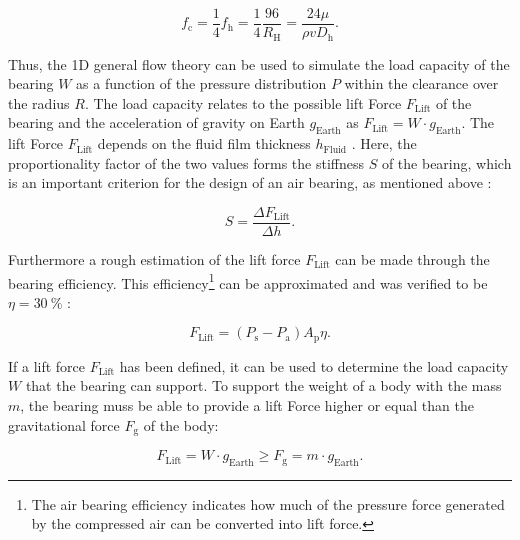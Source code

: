 \begin{equation}
f_\text{c}=\frac{1}{4} f_\text{h} = \frac{1}{4} \frac{96}{R_\text{H}} = \dfrac{24 \mu}{\rho v D_\text{h}} .
\label{eqn:hfric}
\end{equation}

Thus, the 1D general flow theory can be used to simulate the load capacity of the bearing $W$ as a function of the pressure distribution $P$ within the clearance over the radius $R$. The load capacity relates to the possible lift Force $F_\text{Lift}$ of the bearing and the acceleration of gravity on Earth $ g_\text{Earth}$ as $F_\text{Lift} = W \cdot g_\text{Earth}$. The lift Force $F_\text{Lift}$ depends on the fluid film thickness $h_\text{Fluid}$ . Here, the proportionality factor of the two values forms the stiffness $S$ of the bearing, which is an important criterion for the design of an air bearing, as mentioned above \cite{Cui.2018}:

\begin{equation}
S = \frac{\Delta F_\text{Lift}}{\Delta h} .
\label{eqn:stiff}
\end{equation}


Furthermore a rough estimation of the lift force $F_\text{Lift}$ can be made through the bearing efficiency. This efficiency\footnote{The air bearing efficiency indicates how much of the pressure force generated by the compressed air can be converted into lift force.} can be approximated and was verified to be $\eta = 30 \ \%$ \cite{Plante.2005}:

\begin{equation}
F_\text{Lift} =(P_\text{s} - P_\text{a})A_\text{p} \eta .
\label{eqn:coarsef}
\end{equation}

If a lift force $F_\text{Lift}$ has been defined, it can be used to determine the load capacity $W$ that the bearing can support. To support the weight of a body with the mass $m$, the bearing muss be able to provide a lift Force higher or equal than the gravitational force $F_\text{g}$ of the body:

\begin{equation}
F_\text{Lift} = W \cdot g_\text{Earth} \geq F_\text{g} = m \cdot g_\text{Earth} .
\label{eqn:LawOfGravity7}
\end{equation}






